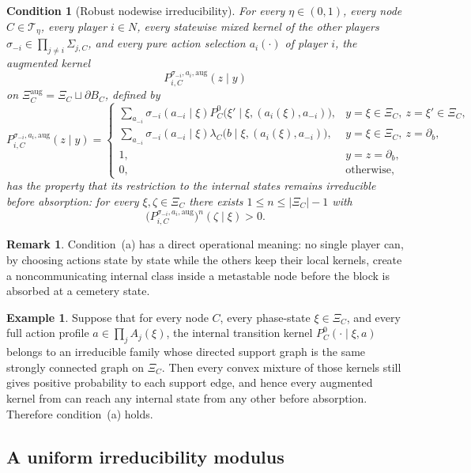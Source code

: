 \documentclass[12pt]{article}
\newtheorem{condition}[theorem]{Condition}
\theoremstyle{definition}
\newtheorem{remark}[theorem]{Remark}
\newtheorem{example}[theorem]{Example}
\newcommand{\1}{\mathbf{1}}
\newcommand{\cT}{\mathcal{T}}
\begin{document}
\begin{condition}[Robust nodewise irreducibility]
\label{cond:a}
For every $\eta\in(0,1)$, every node $C\in\cT_\eta$, every player $i\in N$, every
statewise mixed kernel of the other players
$\sigma_{-i}\in\prod_{j\ne i}\Sigma_{j,C}$, and every pure action selection
$a_i(\cdot)$ of player $i$, the augmented kernel
\[
P_{i,C}^{\sigma_{-i},a_i,\mathrm{aug}}(z\mid y)
\]
on $\Xi_C^{\mathrm{aug}}=\Xi_C\sqcup\partial B_C$, defined by
\[
P_{i,C}^{\sigma_{-i},a_i,\mathrm{aug}}(z\mid y)
=
\begin{cases}
\displaystyle
\sum_{a_{-i}}\sigma_{-i}(a_{-i}\mid\xi)
P_C^0\bigl(\xi'\mid\xi,(a_i(\xi),a_{-i})\bigr),
& y=\xi\in\Xi_C,\ z=\xi'\in\Xi_C,\\[0.7em]
\displaystyle
\sum_{a_{-i}}\sigma_{-i}(a_{-i}\mid\xi)
\lambda_C\bigl(b\mid\xi,(a_i(\xi),a_{-i})\bigr),
& y=\xi\in\Xi_C,\ z=\partial_b,\\[0.7em]
1, & y=z=\partial_b,\\
0, & \text{otherwise,}
\end{cases}
\]
has the property that its restriction to the internal states remains irreducible
before absorption: for every $\xi,\zeta\in\Xi_C$ there exists
$1\le n\le |\Xi_C|-1$ with
\[
\bigl(P_{i,C}^{\sigma_{-i},a_i,\mathrm{aug}}\bigr)^n(\zeta\mid\xi)>0.
\]
\end{condition}

\begin{remark}
Condition~\textnormal{(a)} has a direct operational meaning: no single player can,
by choosing actions state by state while the others keep their local kernels,
create a noncommunicating internal class inside a metastable node before the block
is absorbed at a cemetery state.
\end{remark}

\begin{example}
\label{ex:cond-a-trivial}
Suppose that for every node $C$, every phase-state $\xi\in\Xi_C$, and every full
action profile $a\in\prod_j A_j(\xi)$, the internal transition kernel
$P_C^0(\cdot\mid\xi,a)$ belongs to an irreducible family whose directed support
graph is the same strongly connected graph on $\Xi_C$. Then every convex mixture
of those kernels still gives positive probability to each support edge, and hence
every augmented kernel from  can reach any internal state from any
other before absorption. Therefore condition~\textnormal{(a)} holds.
\end{example}

\subsection{A uniform irreducibility modulus}
\end{document}
